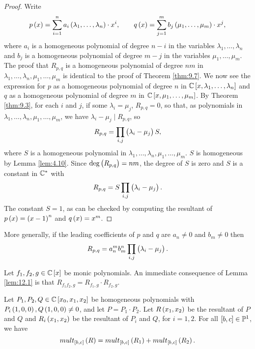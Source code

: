 \begin{proof}
Write
$$ p\br{x} = \sum_{i = 1}^n a_i\br{\lambda_1, \dots, \lambda_n} \cdot x^i, \qquad q\br{x} = \sum_{j = 1}^m b_j\br{\mu_1, \dots, \mu_m} \cdot x^j, $$
where $ a_i $ is a homogeneous polynomial of degree $ n - i $ in the variables $ \lambda_1, \dots, \lambda_n $ and $ b_j $ is a homogeneous polynomial of degree $ m - j $ in the variables $ \mu_1, \dots, \mu_m $. The proof that $ R_{p, q} $ is a homogeneous polynomial of degree $ nm $ in $ \lambda_1, \dots, \lambda_n, \mu_1, \dots, \mu_m $ is identical to the proof of Theorem \ref{thm:9.7}. We now see the expression for $ p $ as a homogeneous polynomial of degree $ n $ in $ \C\sbr{x, \lambda_1, \dots, \lambda_n} $ and $ q $ as a homogeneous polynomial of degree $ m $ in $ \C\sbr{x, \mu_1, \dots, \mu_m} $. By Theorem \ref{thm:9.3}, for each $ i $ and $ j $, if some $ \lambda_i = \mu_j $, $ R_{p, q} = 0 $, so that, as polynomials in $ \lambda_1, \dots, \lambda_n, \mu_1, \dots, \mu_m $, we have $ \lambda_i - \mu_j \mid R_{p, q} $, so
$$ R_{p, q} = \prod_{i, j} \br{\lambda_i - \mu_j}S, $$
where $ S $ is a homogeneous polynomial in $ \lambda_1, \dots, \lambda_n, \mu_1, \dots, \mu_m $. $ S $ is homogeneous by Lemma \ref{lem:4.10}. Since $ \deg\br{R_{p, q}} = nm $, the degree of $ S $ is zero and $ S $ is a constant in $ \mathbb{C}^* $ with
$$ R_{p, q} = S\prod_{i, j} \br{\lambda_i - \mu_j}. $$
The constant $ S = 1 $, as can be checked by computing the resultant of $ p\br{x} = \br{x - 1}^n $ and $ q\br{x} = x^m $.
\end{proof}

\begin{remark}
More generally, if the leading coefficients of $ p $ and $ q $ are $ a_n \ne 0 $ and $ b_m \ne 0 $ then
$$ R_{p, q} = a_n^mb_m^n\prod_{i, j} \br{\lambda_i - \mu_j}. $$
\end{remark}

\begin{remark}
\label{rem:12.3}
Let $ f_1, f_2, g \in \C\sbr{x} $ be monic polynomials. An immediate consequence of Lemma \ref{lem:12.1} is that $ R_{f_1f_2, g} = R_{f_1, g} \cdot R_{f_2, g} $.
\end{remark}

\begin{lemma}
\label{lem:12.4}
Let $ P_1, P_2, Q \in \C\sbr{x_0, x_1, x_2} $ be homogeneous polynomials with $ P_i\br{1, 0, 0}, Q\br{1, 0, 0} \ne 0 $, and let $ P = P_1 \cdot P_2 $. Let $ R\br{x_1, x_2} $ be the resultant of $ P $ and $ Q $ and $ R_i\br{x_1, x_2} $ be the resultant of $ P_i $ and $ Q $, for $ i = 1, 2 $. For all $ \sbr{b, c} \in \P^1 $, we have
$$ mult_{\sbr{b, c}}\br{R} = mult_{\sbr{b, c}}\br{R_1} + mult_{\sbr{b, c}}\br{R_2}. $$
\end{lemma}

